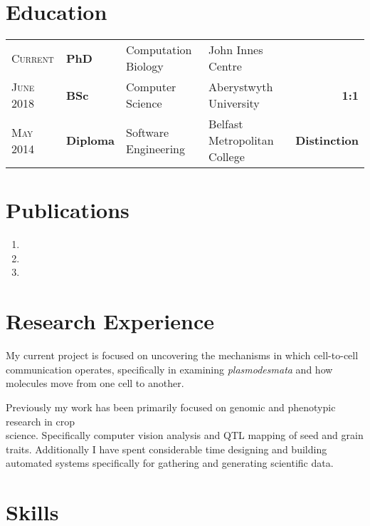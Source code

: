 \documentclass[a4paper,10pt]{article}
\begin{document}
\section{Education}
\begin{tabular}{llllr}

  \textsc{Current}  & \textbf{PhD} & Computation Biology & John Innes Centre &   \\

  \textsc{June} 2018  & \textbf{BSc} & Computer Science & Aberystwyth University & \textbf{1:1} \\

  \textsc{May} 2014& \textbf{Diploma} & Software Engineering & Belfast Metropolitan College &  \textbf{Distinction}

\end{tabular}


\section{Publications}

\begin{enumerate}
\item{}
\item{}
\item{}
\end{enumerate}



\section{Research Experience}

My current project is focused on uncovering the mechanisms in which cell-to-cell communication operates, specifically in examining \textit{plasmodesmata} and how molecules move from one cell to another.

Previously my work has been primarily focused on genomic and phenotypic research in crop \\science. Specifically computer vision analysis and QTL mapping of seed and grain traits. Additionally I have spent considerable time designing and building automated systems specifically for gathering and generating scientific data.


\section{Skills}
\end{document}
